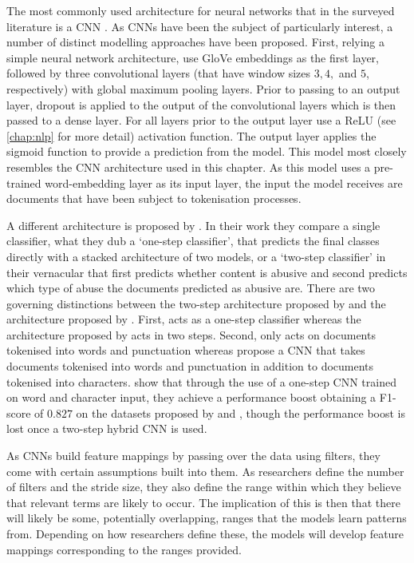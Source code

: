 The most commonly used architecture for neural networks that in the surveyed literature is a CNN \citep{Park:2017,Gamback:2017,Wulczyn:2017,Kolhatkar:2021,Zimmerman:2018,Wang:2020}. As CNNs have been the subject of particularly interest, a number of distinct modelling approaches have been proposed. First, relying a simple neural network architecture, \citet{Kolhatkar:2021} use GloVe embeddings as the first layer, followed by three convolutional layers (that have window sizes $3, 4,$ and $5$, respectively) with global maximum pooling layers. Prior to passing to an output layer, dropout is applied to the output of the convolutional layers which is then passed to a dense layer. For all layers prior to the output layer use a ReLU (see \autoref{chap:nlp} for more detail) activation function. The output layer applies the sigmoid function to provide a prediction from the model. This model most closely resembles the CNN architecture used in this chapter. As this model uses a pre-trained word-embedding layer as its input layer, the input the model receives are documents that have been subject to tokenisation processes.

A different architecture is proposed by \citet{Park:2017}. In their work they compare a single classifier, what they dub a `one-step classifier', that predicts the final classes directly with a stacked architecture of two models, or a `two-step classifier' in their vernacular that first predicts whether content is abusive and second predicts which type of abuse the documents predicted as abusive are. There are two governing distinctions between the two-step architecture proposed by \citet{Park:2017} and the architecture proposed by \citet{Kolhatkar:2021}. First, \citet{Kolhatkar:2021} acts as a one-step classifier whereas the architecture proposed by \citet{Park:2017} acts in two steps. Second, \citet{Kolhatkar:2021} only acts on documents tokenised into words and punctuation whereas \citet{Park:2017} propose a CNN that takes documents tokenised into words and punctuation in addition to documents tokenised into characters. \citet{Park:2017} show that through the use of a one-step CNN trained on word and character input, they achieve a performance boost obtaining a F1-score of $0.827$ on the datasets proposed by \citet{Waseem-Hovy:2016} and \citet{Waseem:2016}, though the performance boost is lost once a two-step hybrid CNN is used.

As CNNs build feature mappings by passing over the data using filters, they come with certain assumptions built into them. As researchers define the number of filters and the stride size, they also define the range within which they believe that relevant terms are likely to occur. The implication of this is then that there will likely be some, potentially overlapping, ranges that the models learn patterns from. Depending on how researchers define these, the models will develop feature mappings corresponding to the ranges provided.

